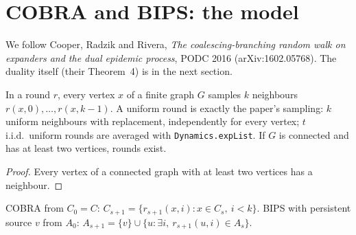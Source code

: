 \section{COBRA and BIPS: the model}\label{sec:crr-cobra-bips}
We follow Cooper, Radzik and Rivera, \emph{The coalescing-branching random walk on expanders and
the dual epidemic process}, PODC 2016 (arXiv:1602.05768). The duality itself (their Theorem~4)
is in the next section.
\begin{definition}\label{def:choices}
\leanok
In a round $r$, every vertex $x$ of a finite graph $G$ samples $k$ neighbours
$r(x,0),\dots,r(x,k-1)$. A uniform round is exactly the paper's sampling: $k$ uniform neighbours
with replacement, independently for every vertex; $t$ i.i.d.\ uniform rounds are averaged with
\texttt{Dynamics.expList}. If $G$ is connected and has at least two vertices, rounds exist.
\end{definition}
\begin{proof}\leanok
Every vertex of a connected graph with at least two vertices has a neighbour.
\end{proof}
\begin{definition}\label{def:cobra}
\leanok{}
COBRA from $C_0=C$: $C_{s+1}=\{r_{s+1}(x,i) : x\in C_s,\ i<k\}$. BIPS with persistent source $v$
from $A_0$: $A_{s+1}=\{v\}\cup\{u : \exists i,\ r_{s+1}(u,i)\in A_s\}$.
\end{definition}


